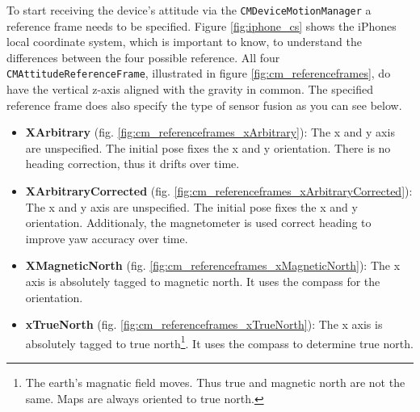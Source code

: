 To start receiving the device's attitude via the \texttt{CMDeviceMotionManager} a reference frame needs to be specified.
Figure \ref{fig:iphone_cs} shows the iPhones local coordinate system, which is important to know, to understand the differences between the four possible reference.
All four \texttt{CMAttitudeReferenceFrame}, illustrated in figure \ref{fig:cm_referenceframes}, do have the vertical z-axis aligned with the gravity in common.
The specified reference frame does also specify the type of sensor fusion as you can see below.
\begin{itemize}
  \item \textbf{XArbitrary} (fig. \ref{fig:cm_referenceframes_xArbitrary}): The x and y axis are unspecified. The initial pose fixes the x and y orientation. There is no heading correction, thus it drifts over time.
  \item \textbf{XArbitraryCorrected} (fig. \ref{fig:cm_referenceframes_xArbitraryCorrected}): The x and y axis are unspecified. The initial pose fixes the x and y orientation. Additionaly, the magnetometer is used correct heading to improve yaw accuracy over time.
  \item \textbf{XMagneticNorth} (fig. \ref{fig:cm_referenceframes_xMagneticNorth}): The x axis is absolutely tagged to magnetic north. It uses the compass for the orientation.
  \item \textbf{xTrueNorth} (fig. \ref{fig:cm_referenceframes_xTrueNorth}): The x axis is absolutely tagged to true north\footnote{The earth's magnatic field moves. Thus true and magnetic north are not the same. Maps are always oriented to true north.}. It uses the compass to determine true north.
\end{itemize}

